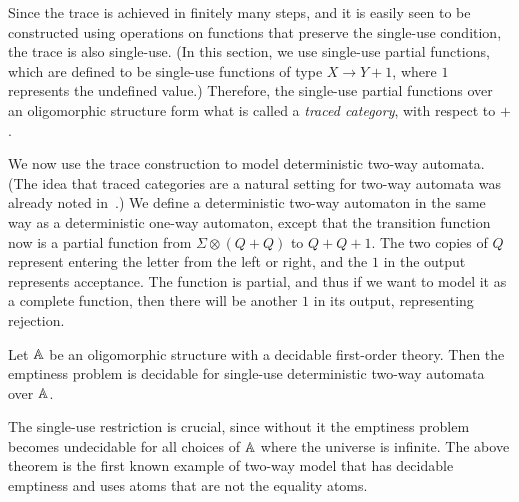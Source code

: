 Since the trace is achieved in finitely many steps, and it is easily seen to be constructed using operations on functions that preserve the single-use condition, the trace is also single-use. (In this section, we use single-use partial functions, which are defined to be single-use functions of type $X \to Y +1$, where $1$ represents the undefined value.) Therefore, the single-use partial functions over an oligomorphic structure form what is called a \emph{traced category}, with respect to $+$. 



We now use the trace construction to model deterministic two-way automata. (The idea that traced categories are a natural setting for two-way automata was already noted in~\cite{hines2003categorical}.) We define a deterministic two-way automaton in the same way as a deterministic one-way automaton, except that the transition function now is a partial function from $\Sigma \otimes (Q + Q)$ to $Q + Q + 1$. 
The two copies of $Q$ represent entering the letter from the left or right, and the $1$ in the output represents acceptance.  The function is partial, and thus if we want to model it as a complete function, then there will be another $1$ in its output, representing rejection.

\begin{theorem}\label{thm:two-way-automata}
    Let $\mathbb A$ be an oligomorphic structure with a decidable first-order theory. Then the emptiness problem is decidable for single-use deterministic  two-way automata over $\mathbb A$.
\end{theorem}

The single-use restriction is crucial, since without it the emptiness problem becomes undecidable for all choices of $\mathbb A$ where the universe is infinite. The above theorem is the first known example of two-way model that has decidable emptiness and uses atoms that are not the equality atoms. 

